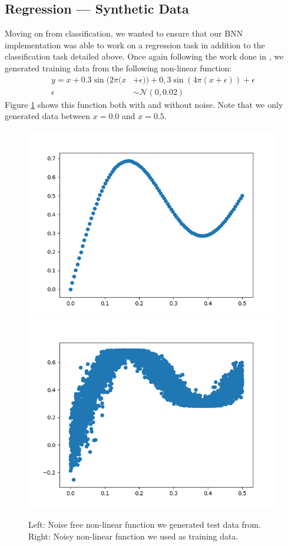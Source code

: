 \documentclass[11pt]{article}
\begin{document}
\subsection{Regression --- Synthetic Data}
Moving on from classification, we wanted to ensure that our BNN implementation 
was able to work on a regression task in addition to the classification task
detailed above. Once again following the work done in \cite{blundell}, we 
generated training data from the following non-linear function:
\begin{align*}
  y = x + 0.3 \sin(2\pi (x &+ \epsilon)) + 0,3 \sin(4\pi (x + \epsilon)) + \epsilon \\
  \epsilon &\sim \mathcal{N}(0, 0.02)
\end{align*}
Figure \ref{fig:reg_syth_data} shows this function both with and without noise.
Note that we only generated data between $x=0.0$ and $x=0.5$.

\begin{figure}[H]
  \centering\includegraphics[width=.45\textwidth]{figures/regression_curve.png}
  \centering\includegraphics[width=.45\textwidth]{figures/regression_curve_with_noise.png}
  \caption{Left: Noise free non-linear function we generated test data from.
  Right: Noisy non-linear function we used as training data.}
  \label{fig:reg_syth_data}
\end{figure}
\end{document}
